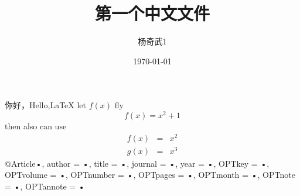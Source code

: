 \documentclass{ctexart}  %
\title{第一个中文文件}
\author{\kaishu 杨奇武1}
\date{\today}
\begin{document}
\maketitle
你好，Hello,\LaTeX
let $f(x)$ fly$$f(x) = x^2 + 1$$
then also can use
\begin{eqnarray}
f(x)& = &x^2\\
g(x)& =& x^3
\end{eqnarray}
@Article{•,
author = {•},
title = {•},
journal = {•},
year = {•},
OPTkey = {•},
OPTvolume = {•},
OPTnumber = {•},
OPTpages = {•},
OPTmonth = {•},
OPTnote = {•},
OPTannote = {•}
}
\end{document}
